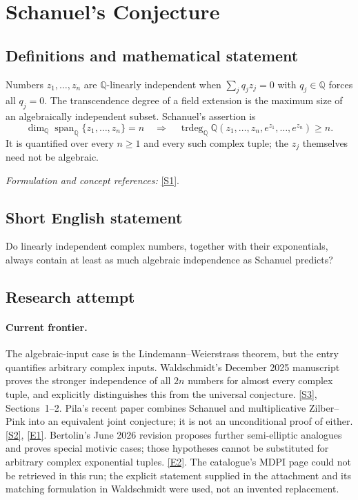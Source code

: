\documentclass[11pt,a4paper]{article}
\newcommand{\Q}{\mathbb{Q}}
\newcommand{\sref}[2]{\hyperlink{source:#1:#2}{[S#2]}}
\newcommand{\eref}[2]{\hyperlink{extra:#1:#2}{[E#2]}}
\newif\ifshowcatalogue
\newcommand{\cataloguescope}[1]{\ifshowcatalogue
 \paragraph{Exact scope in the supplied catalogue.}
 \begin{quote}\small #1\end{quote}\fi}
\numberwithin{equation}{section}
\begin{document}
\setcounter{section}{0}
\clearpage
\section*{\texorpdfstring{Schanuel's Conjecture}{Schanuel's Conjecture}}\label{3367}
\subsection{Definitions and mathematical statement}
Numbers $z_1,\ldots,z_n$ are $\Q$-linearly independent when $\sum_jq_jz_j=0$ with $q_j\in\Q$ forces all $q_j=0$. The transcendence degree of a field extension is the maximum size of an algebraically independent subset. Schanuel's assertion is
\[
 \dim_{\Q}\operatorname{span}_{\Q}\{z_1,\ldots,z_n\}=n
 \quad\Longrightarrow\quad
 \operatorname{trdeg}_{\Q}\Q(z_1,\ldots,z_n,e^{z_1},\ldots,e^{z_n})\ge n.
\]
It is quantified over every $n\ge1$ and every such complex tuple; the $z_j$ themselves need not be algebraic.
\par\smallskip\textit{Formulation and concept references:} \sref{3367}{1}.
\cataloguescope{Prove or disprove that if z\_1,...,z\_n in C are linearly independent over Q, then the field Q(z\_1,...,z\_n,e\textasciicircum{}\{z\_1\},...,e\textasciicircum{}\{z\_n\}) has transcendence degree at least n over Q.}
\subsection{Short English statement}
Do linearly independent complex numbers, together with their exponentials, always contain at least as much algebraic independence as Schanuel predicts?
\subsection{Research attempt}

\paragraph{Current frontier.}
The algebraic-input case is the Lindemann--Weierstrass theorem, but the
entry quantifies arbitrary complex inputs. Waldschmidt's December 2025
manuscript proves the stronger independence of all $2n$ numbers for
almost every complex tuple, and explicitly distinguishes this from the
universal conjecture. \sref{3367}{3}, Sections~1--2. Pila's recent paper
combines Schanuel and multiplicative Zilber--Pink into an equivalent joint
conjecture; it is not an unconditional proof of either. \sref{3367}{2},
\eref{3367}{1}. Bertolin's June 2026 revision proposes further
semi-elliptic analogues and proves special motivic cases; those hypotheses
cannot be substituted for arbitrary complex exponential tuples.
\eref{3367}{2}. The catalogue's MDPI page could not be retrieved in this
run; the explicit statement supplied in the attachment and its matching
formulation in Waldschmidt were used, not an invented replacement.
\end{document}
